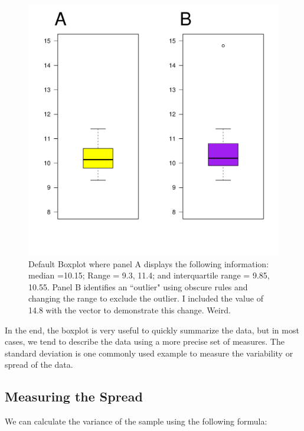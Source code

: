 \documentclass{tufte-handout}\usepackage[]{graphicx}\usepackage[]{color}
\makeatletter
\def\maxwidth{ %
  \ifdim\Gin@nat@width>\linewidth
    \linewidth
  \else
    \Gin@nat@width
  \fi
}
\newenvironment{knitrout}{}{} %
\makeatother
\begin{document}
\begin{figure}
\caption{Default Boxplot where panel A displays the following information: median =10.15; Range = 9.3, 11.4; and interquartile range = 9.85, 10.55. Panel B identifies an ``outlier" using obscure rules and changing the range to exclude the outlier. I included the value of 14.8 with the vector to demonstrate this change. Weird.}
\label{fig:default_bp}
\begin{knitrout}
\color{fgcolor}
\includegraphics[width=\maxwidth]{figure/unnamed-chunk-6-1} 

\end{knitrout}
\end{figure}

In the end, the boxplot is very useful to quickly summarize the data, but in most cases, we tend to describe the data using a more precise set of measures. The standard deviation is one commonly used example to measure the variability or spread of the data. 

\subsection{Measuring the Spread}

We can calculate the variance of the sample using the following formula: 
\end{document}
